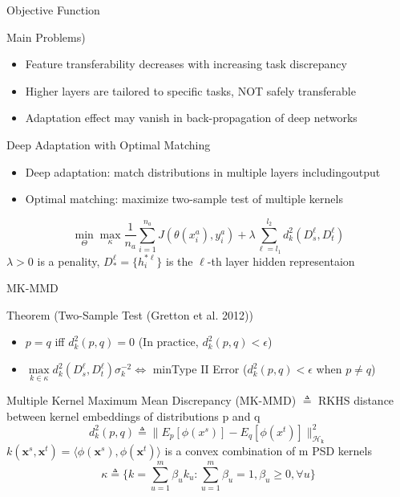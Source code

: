 \documentclass{beamer}
\begin{document}
\begin{frame}[fragile]{Objective Function}

\begin{block}{Main Problems)}
\begin{itemize}
\item{Feature transferability decreases with increasing task discrepancy}
\item{Higher layers are tailored to specific tasks, NOT safely transferable}
\item{Adaptation effect may vanish in back-propagation of deep networks}
\end{itemize}
\end{block}

\begin{block}{Deep Adaptation with Optimal Matching}
\begin{itemize}
\item{Deep adaptation: match distributions in multiple layers includingoutput}
\item{Optimal matching: maximize two-sample test of multiple kernels}
\end{itemize}
\begin{equation}
\min\limits_\Theta\max\limits_\kappa\frac{1}{n_a}\sum\limits_{i=1}^{n_a}J(\theta(x_i^a),y_i^a)+\lambda\sum\limits_{\ell=l_1}^{l_2}d_k^2(D_s^\ell,D_t^\ell)
\end{equation}
$\lambda > 0$ is a penality, $D_*^\ell=\{h_i^{*\ell}\}$ is the $\ell$-th layer hidden representaion
\end{block}

\end{frame}
\begin{frame}[fragile]{MK-MMD}
\begin{block}{Theorem (Two-Sample Test (Gretton et al. 2012))}
\begin{itemize}
\item{$p=q$ iff $d^2_k(p,q)=0$ (In practice,  $d^2_k(p,q)<\epsilon$})
\item{$\max\limits_{k \in \kappa}d_k^2(D_s^\ell,D_t^\ell)\sigma_k^{-2} \Leftrightarrow$ minType II Error ($d^2_k(p,q)<\epsilon$ when $p\neq q$)}
\end{itemize}
\end{block}
\begin{block}{Multiple Kernel Maximum Mean Discrepancy (MK-MMD)}
$\triangleq$ RKHS distance between kernel embeddings of distributions p and q
\begin{equation}
d_k^2(p,q)\triangleq \lVert E_p[\phi(x^s)]-E_q[\phi(x^t)] \rVert_\mathcal{H_\mathrm{k}}^2
\end{equation}
$k(\mathbf{x}^s,\mathbf{x}^t)=\langle\phi(\mathbf{x}^s), \phi(\mathbf{x}^t)\rangle$ is a convex combination of m PSD kernels
\begin{equation}
\kappa\triangleq\Bigg\{k=\sum\limits_{u=1}^m\beta_uk_u:\sum\limits_{u=1}^m\beta_u=1,\beta_u\geq0,\forall u\Bigg\}
\end{equation}
\end{block}

\end{frame}
\end{document}
